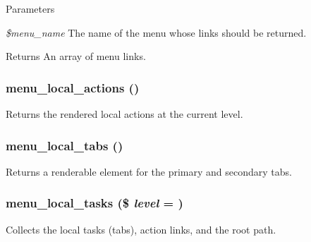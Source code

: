 \begin{DoxyParams}{Parameters}
\item[{\em \$menu\_\-name}]The name of the menu whose links should be returned.\end{DoxyParams}
\begin{DoxyReturn}{Returns}
An array of menu links. 
\end{DoxyReturn}
\hypertarget{group__menu_ga150a37ede061833b2b9fde658d005426}{
\subsubsection[{menu\_\-local\_\-actions}]{\setlength{\rightskip}{0pt plus 5cm}menu\_\-local\_\-actions ()}}
\label{group__menu_ga150a37ede061833b2b9fde658d005426}
Returns the rendered local actions at the current level. \hypertarget{group__menu_ga9fe648c89a4e94e63c7a88076ed12a94}{
\subsubsection[{menu\_\-local\_\-tabs}]{\setlength{\rightskip}{0pt plus 5cm}menu\_\-local\_\-tabs ()}}
\label{group__menu_ga9fe648c89a4e94e63c7a88076ed12a94}
Returns a renderable element for the primary and secondary tabs. \hypertarget{group__menu_gadb8bb3644e114166950142280085cf3e}{
\subsubsection[{menu\_\-local\_\-tasks}]{\setlength{\rightskip}{0pt plus 5cm}menu\_\-local\_\-tasks (\$ {\em level} = {})}}
\label{group__menu_gadb8bb3644e114166950142280085cf3e}
Collects the local tasks (tabs), action links, and the root path.


